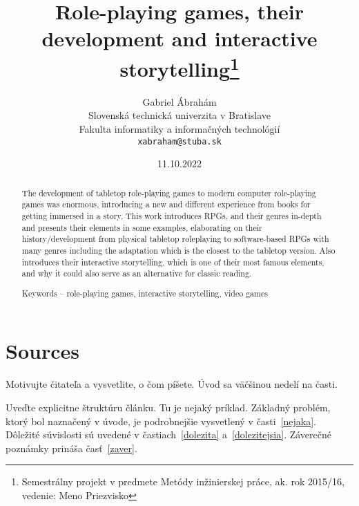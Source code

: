 \documentclass[10pt,twoside,english,a4paper]{article}
\title{Role-playing games, their development and interactive storytelling\thanks{Semestrálny projekt v predmete Metódy inžinierskej práce, ak. rok 2015/16, vedenie: Meno Priezvisko}} %
\author{Gabriel Ábrahám\\[2pt]
	{\small Slovenská technická univerzita v Bratislave}\\
	{\small Fakulta informatiky a informačných technológií}\\
	{\small \texttt{xabraham@stuba.sk}}
	}
\date{\small 11.10.2022} %
\begin{document}
\maketitle

\begin{abstract}
The development of tabletop role-playing games to modern 
computer role-playing games was enormous, introducing a new and 
different experience from books for getting immersed in a story. This 
work introduces RPGs, and their genres in-depth and presents their 
elements in some examples, elaborating on their 
history/development from physical tabletop roleplaying to software-based RPGs with many genres including the adaptation which is the 
closest to the tabletop version. Also introduces their interactive 
storytelling, which is one of their most famous elements, and why it 
could also serve as an alternative for classic reading.

Keywords – role-playing games, interactive storytelling, video games
\end{abstract}




\section{Sources}

Motivujte čitateľa a vysvetlite, o čom píšete. Úvod sa väčšinou nedelí na časti.

Uveďte explicitne štruktúru článku. Tu je nejaký príklad.
Základný problém, ktorý bol naznačený v úvode, je podrobnejšie vysvetlený v časti~\ref{nejaka}.
Dôležité súvislosti sú uvedené v častiach~\ref{dolezita} a~\ref{dolezitejsia}.
Záverečné poznámky prináša časť~\ref{zaver}.
\end{document}
